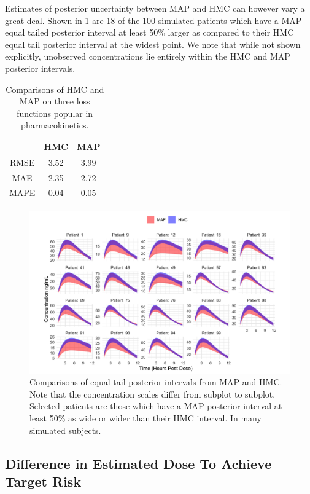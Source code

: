 Estimates of posterior uncertainty between MAP and HMC can however vary a great deal.   Shown in \cref{fig:fig6} are 18 of the 100 simulated patients which have a MAP equal tailed posterior interval at least 50\% larger as compared to their HMC equal tail posterior interval at the widest point. We note that while not shown explicitly, unobserved concentrations lie entirely within the HMC and MAP posterior intervals.

\begin{table}
	\centering
\begin{tabular}{|c|c|c|}
	\hline 
	& HMC & MAP \\ 
	\hline 
	RMSE & 3.52 & 3.99 \\ 
	\hline 
	MAE & 2.35 & 2.72 \\ 
	\hline 
	MAPE & 0.04 & 0.05 \\ 
	\hline 
\end{tabular} 
\caption{Comparisons of HMC and MAP on three loss functions popular in pharmacokinetics.}
\end{table}

\begin{figure}
	\centering
	\includegraphics[width=1\linewidth]{figs/intervals}
	\caption{Comparisons of equal tail posterior intervals from MAP and HMC. Note that the concentration scales differ from subplot to subplot.  Selected patients are those which have a MAP posterior interval at least 50\% as wide or wider than their HMC interval.  In many simulated subjects.}
	\label{fig:fig6}
\end{figure}


\subsection*{Difference in Estimated Dose To Achieve Target Risk}


